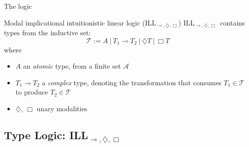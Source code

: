\documentclass{beamer}
\newcommand{\li}{\!\multimap\!}
\newcommand{\mill}{ILL${}_{\multimap,\diamondsuit,\Box}$}
\newcommand{\blocktitle}[1]{\normalsize\textcolor{pred}{#1}}
\begin{document}
\begin{frame}{The logic}
	\small
	\begin{block}{\blocktitle{Modal implicational intuitionistic linear logic (ILL$_{\multimap,\diamondsuit,\Box}$)}}
	\mill\ contains types from the inductive set:
	\[
		\mathcal{T} := A \ | \ T_1 \li T_2 \ | \ \diamondsuit T \ | \ \Box T
	\]
	where 
	\begin{itemize}
		\item	$A$ an \textit{atomic} type, from a finite set $\mathcal{A}$
		\item $T_1 \li T_2$ a \textit{complex} type, denoting the transformation that consumes $T_1 
		\in \mathcal{T}$ to produce $T_2 \in \mathcal{T}$
		\item $\diamondsuit$, $\Box$ unary modalities
	\end{itemize}
	\end{block}
\end{frame}

\subsection{Type Logic: ILL${}_{\multimap, \diamondsuit, \Box}$}
\end{document}
